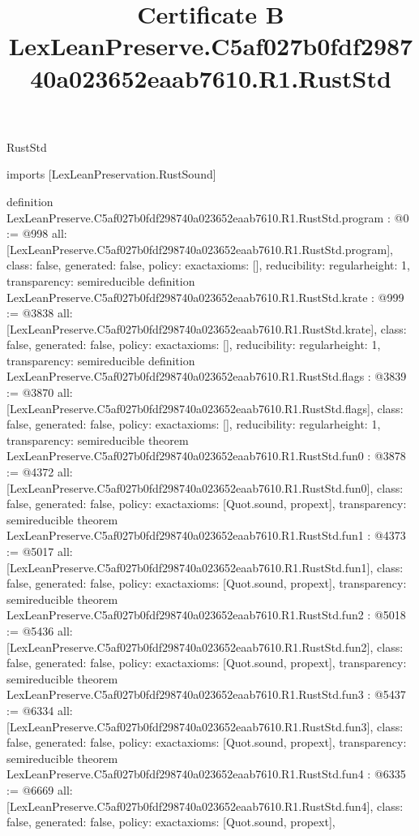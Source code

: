 \begin{lexlean}{RustStd}
\title{Certificate B LexLeanPreserve.C5af027b0fdf298740a023652eaab7610.R1.RustStd}
\begin{coremodule}
imports [LexLeanPreservation.RustSound]

definition LexLeanPreserve.C5af027b0fdf298740a023652eaab7610.R1.RustStd.program : @0 := @998 {
  all: [LexLeanPreserve.C5af027b0fdf298740a023652eaab7610.R1.RustStd.program],
  class: false,
  generated: false,
  policy: exact{axioms: []},
  reducibility: regular{height: 1},
  transparency: semireducible
}
definition LexLeanPreserve.C5af027b0fdf298740a023652eaab7610.R1.RustStd.krate : @999 := @3838 {
  all: [LexLeanPreserve.C5af027b0fdf298740a023652eaab7610.R1.RustStd.krate],
  class: false,
  generated: false,
  policy: exact{axioms: []},
  reducibility: regular{height: 1},
  transparency: semireducible
}
definition LexLeanPreserve.C5af027b0fdf298740a023652eaab7610.R1.RustStd.flags : @3839 := @3870 {
  all: [LexLeanPreserve.C5af027b0fdf298740a023652eaab7610.R1.RustStd.flags],
  class: false,
  generated: false,
  policy: exact{axioms: []},
  reducibility: regular{height: 1},
  transparency: semireducible
}
theorem LexLeanPreserve.C5af027b0fdf298740a023652eaab7610.R1.RustStd.fun0 : @3878 := @4372 {
  all: [LexLeanPreserve.C5af027b0fdf298740a023652eaab7610.R1.RustStd.fun0],
  class: false,
  generated: false,
  policy: exact{axioms: [Quot.sound, propext]},
  transparency: semireducible
}
theorem LexLeanPreserve.C5af027b0fdf298740a023652eaab7610.R1.RustStd.fun1 : @4373 := @5017 {
  all: [LexLeanPreserve.C5af027b0fdf298740a023652eaab7610.R1.RustStd.fun1],
  class: false,
  generated: false,
  policy: exact{axioms: [Quot.sound, propext]},
  transparency: semireducible
}
theorem LexLeanPreserve.C5af027b0fdf298740a023652eaab7610.R1.RustStd.fun2 : @5018 := @5436 {
  all: [LexLeanPreserve.C5af027b0fdf298740a023652eaab7610.R1.RustStd.fun2],
  class: false,
  generated: false,
  policy: exact{axioms: [Quot.sound, propext]},
  transparency: semireducible
}
theorem LexLeanPreserve.C5af027b0fdf298740a023652eaab7610.R1.RustStd.fun3 : @5437 := @6334 {
  all: [LexLeanPreserve.C5af027b0fdf298740a023652eaab7610.R1.RustStd.fun3],
  class: false,
  generated: false,
  policy: exact{axioms: [Quot.sound, propext]},
  transparency: semireducible
}
theorem LexLeanPreserve.C5af027b0fdf298740a023652eaab7610.R1.RustStd.fun4 : @6335 := @6669 {
  all: [LexLeanPreserve.C5af027b0fdf298740a023652eaab7610.R1.RustStd.fun4],
  class: false,
  generated: false,
  policy: exact{axioms: [Quot.sound, propext]},
}
\end{coremodule}
\end{lexlean}
